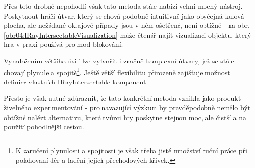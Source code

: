 Přes toto drobné nepohodlí však tato metoda stále nabízí velmi mocný nástroj. Poskytnout hráči útvar, který se chová podobně intuitivně jako obyčejná kulová plocha, ale nežádané okrajové případy jsou v něm ošetřené, není obtížné - na obr.\ref{obr04:IRayIntersectableVisualization} může čtenář najít vizualizaci objektu, který hra v praxi používá pro mod blokování. 


Vynaložením většího úsilí lze vytvořit i značně komplexní útvary, jež se stále chovají plynule a spojitě\footnote{K zaručení plynulosti a spojitosti je však třeba jisté množství ruční práce při polohovaní děr a ladění jejich přechodových křivek.}. Ještě větší flexibilitu přirozeně zajišťuje možnost definice vlastních IRayIntersectable komponent. 

Přesto je však nutné zdůraznit, že tato konkrétní metoda vznikla jako produkt živelného experimentování - pro navazující výzkum by pravděpodobně nemělo být obtížné nalézt alternativu, která tvůrci hry poskytne stejnou moc, ale čistší a na použití pohodlnější cestou. 

